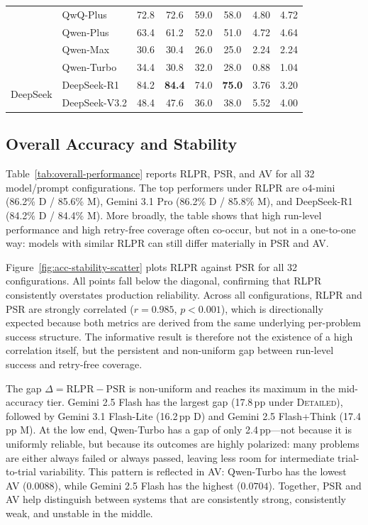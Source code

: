 \documentclass[11pt,a4paper]{article}
\begin{document}
\begin{table}[t]
{\begin{tabular}{llcccccc}
  & QwQ-Plus   & 72.8 & 72.6 & 59.0 & 58.0 & 4.80 & 4.72 \\
  & Qwen-Plus  & 63.4 & 61.2 & 52.0 & 51.0 & 4.72 & 4.64 \\
  & Qwen-Max   & 30.6 & 30.4 & 26.0 & 25.0 & 2.24 & 2.24 \\
  & Qwen-Turbo & 34.4 & 30.8 & 32.0 & 28.0 & 0.88 & 1.04 \\
\midrule
\multirow{2}{*}{DeepSeek}
  & DeepSeek-R1   & 84.2 & \textbf{84.4} & 74.0 & \textbf{75.0} & 3.76 & 3.20 \\
  & DeepSeek-V3.2 & 48.4 & 47.6 & 36.0 & 38.0 & 5.52 & 4.00 \\
\bottomrule
\end{tabular}
}
\end{table}

\subsection{Overall Accuracy and Stability}
Table~\ref{tab:overall-performance} reports RLPR, PSR, and AV for all 32 model/prompt configurations. The top performers under RLPR are o4-mini (86.2\% D / 85.6\% M), Gemini 3.1 Pro (86.2\% D / 85.8\% M), and DeepSeek-R1 (84.2\% D / 84.4\% M). More broadly, the table shows that high run-level performance and high retry-free coverage often co-occur, but not in a one-to-one way: models with similar RLPR can still differ materially in PSR and AV.

Figure~\ref{fig:acc-stability-scatter} plots RLPR against PSR for all 32 configurations. All points fall below the diagonal, confirming that RLPR consistently overstates production reliability. Across all configurations, RLPR and PSR are strongly correlated ($r=0.985$, $p<0.001$), which is directionally expected because both metrics are derived from the same underlying per-problem success structure. The informative result is therefore not the existence of a high correlation itself, but the persistent and non-uniform gap between run-level success and retry-free coverage.

The gap $\Delta = \mathrm{RLPR} - \mathrm{PSR}$ is non-uniform and reaches its maximum in the mid-accuracy tier. Gemini 2.5 Flash has the largest gap (17.8\,pp under \textsc{Detailed}), followed by Gemini 3.1 Flash-Lite (16.2\,pp D) and Gemini 2.5 Flash+Think (17.4\,pp M). At the low end, Qwen-Turbo has a gap of only 2.4\,pp---not because it is uniformly reliable, but because its outcomes are highly polarized: many problems are either always failed or always passed, leaving less room for intermediate trial-to-trial variability. This pattern is reflected in AV: Qwen-Turbo has the lowest AV ($0.0088$), while Gemini 2.5 Flash has the highest ($0.0704$). Together, PSR and AV help distinguish between systems that are consistently strong, consistently weak, and unstable in the middle.
\end{document}
